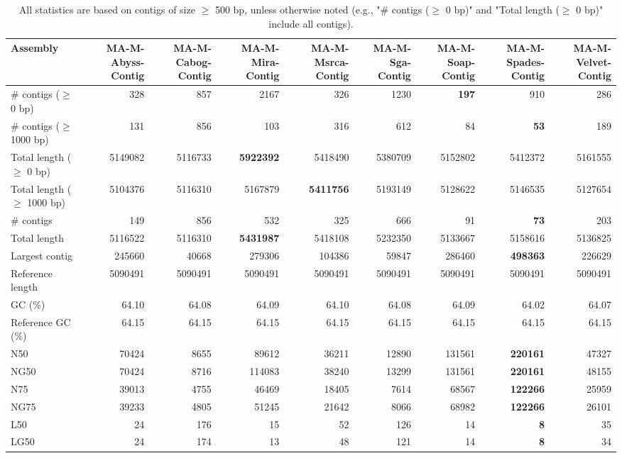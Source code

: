 \documentclass[12pt,a4paper]{article}
\begin{document}
\begin{table}[ht]
\begin{center}
\caption{All statistics are based on contigs of size $\geq$ 500 bp, unless otherwise noted (e.g., "\# contigs ($\geq$ 0 bp)" and "Total length ($\geq$ 0 bp)" include all contigs).}
\begin{tabular}{|l*{8}{|r}|}
\hline
Assembly & MA-M-Abyss-Contig & MA-M-Cabog-Contig & MA-M-Mira-Contig & MA-M-Msrca-Contig & MA-M-Sga-Contig & MA-M-Soap-Contig & MA-M-Spades-Contig & MA-M-Velvet-Contig \\ \hline
\# contigs ($\geq$ 0 bp) & 328 & 857 & 2167 & 326 & 1230 & {\bf 197} & 910 & 286 \\ \hline
\# contigs ($\geq$ 1000 bp) & 131 & 856 & 103 & 316 & 612 & 84 & {\bf 53} & 189 \\ \hline
Total length ($\geq$ 0 bp) & 5149082 & 5116733 & {\bf 5922392} & 5418490 & 5380709 & 5152802 & 5412372 & 5161555 \\ \hline
Total length ($\geq$ 1000 bp) & 5104376 & 5116310 & 5167879 & {\bf 5411756} & 5193149 & 5128622 & 5146535 & 5127654 \\ \hline
\# contigs & 149 & 856 & 532 & 325 & 666 & 91 & {\bf 73} & 203 \\ \hline
Total length & 5116522 & 5116310 & {\bf 5431987} & 5418108 & 5232350 & 5133667 & 5158616 & 5136825 \\ \hline
Largest contig & 245660 & 40668 & 279306 & 104386 & 59847 & 286460 & {\bf 498363} & 226629 \\ \hline
Reference length & 5090491 & 5090491 & 5090491 & 5090491 & 5090491 & 5090491 & 5090491 & 5090491 \\ \hline
GC (\%) & 64.10 & 64.08 & 64.09 & 64.10 & 64.08 & 64.09 & 64.02 & 64.07 \\ \hline
Reference GC (\%) & 64.15 & 64.15 & 64.15 & 64.15 & 64.15 & 64.15 & 64.15 & 64.15 \\ \hline
N50 & 70424 & 8655 & 89612 & 36211 & 12890 & 131561 & {\bf 220161} & 47327 \\ \hline
NG50 & 70424 & 8716 & 114083 & 38240 & 13299 & 131561 & {\bf 220161} & 48155 \\ \hline
N75 & 39013 & 4755 & 46469 & 18405 & 7614 & 68567 & {\bf 122266} & 25959 \\ \hline
NG75 & 39233 & 4805 & 51245 & 21642 & 8066 & 68982 & {\bf 122266} & 26101 \\ \hline
L50 & 24 & 176 & 15 & 52 & 126 & 14 & {\bf 8} & 35 \\ \hline
LG50 & 24 & 174 & 13 & 48 & 121 & 14 & {\bf 8} & 34 \\ \hline

\end{tabular}
\end{center}
\end{table}
\end{document}
